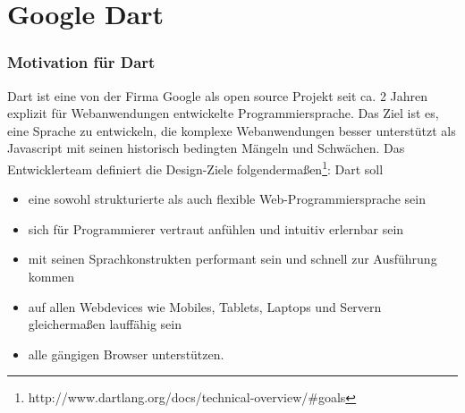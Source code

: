 \section{Google Dart}\label{s.Google Dart }

\subsubsection{Motivation für Dart}
Dart ist eine von der Firma Google als open source Projekt seit ca. 2 Jahren explizit für Webanwendungen entwickelte Programmiersprache. Das Ziel ist es, eine Sprache zu entwickeln, die komplexe Webanwendungen besser unterstützt als Javascript mit seinen historisch bedingten Mängeln und Schwächen.
Das Entwicklerteam definiert die Design-Ziele folgendermaßen\footnote{http://www.dartlang.org/docs/technical-overview/\#goals}:
Dart soll
\begin{itemize}   
\item eine sowohl strukturierte als auch flexible Web-Programmiersprache sein
\item sich für Programmierer vertraut anfühlen und intuitiv erlernbar sein 
\item mit seinen Sprachkonstrukten performant sein und schnell zur Ausführung kommen
\item auf allen Webdevices wie Mobiles, Tablets, Laptops und Servern gleichermaßen lauffähig sein
\item alle gängigen Browser unterstützen.
\end{itemize}

